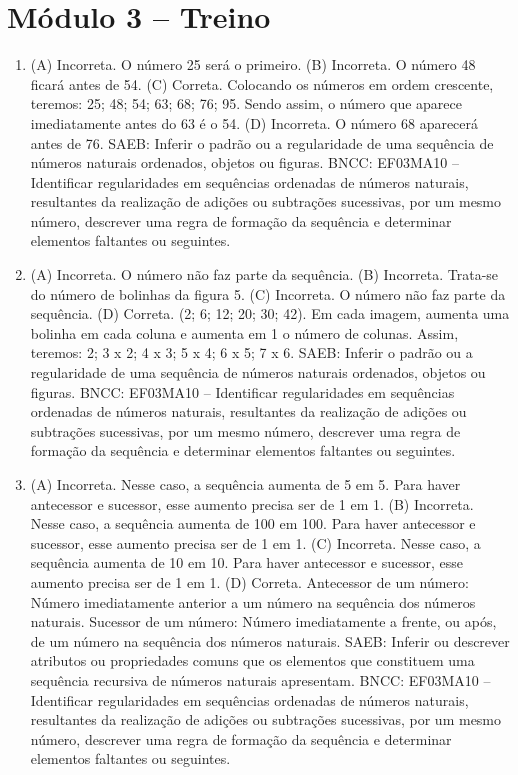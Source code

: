 \section*{Módulo 3 -- Treino}

\begin{enumerate}
\item
(A) Incorreta. O número 25 será o primeiro.
(B) Incorreta. O número 48 ficará antes de 54.
(C) Correta. Colocando os números em ordem crescente, teremos: 25; 48; 54; 63; 68; 76; 95. Sendo assim, o número que aparece imediatamente antes do 63 é o 54.
(D) Incorreta. O número 68 aparecerá antes de 76.
SAEB: Inferir o padrão ou a regularidade de uma sequência de números naturais ordenados, objetos ou figuras.
BNCC: EF03MA10 -- Identificar regularidades em sequências ordenadas de números naturais,
resultantes da realização de adições ou subtrações sucessivas, por um mesmo número,
descrever uma regra de formação da sequência e determinar elementos faltantes ou seguintes.

\item
(A) Incorreta. O número não faz parte da sequência.
(B) Incorreta. Trata-se do número de bolinhas da figura 5.
(C) Incorreta. O número não faz parte da sequência.
(D) Correta. (2; 6; 12; 20; 30; 42). Em cada imagem, aumenta uma bolinha em cada coluna e aumenta em 1 o número de colunas. Assim, teremos: 2; 3 x 2; 4 x 3; 5 x 4; 6 x 5; 7 x 6.
SAEB: Inferir o padrão ou a regularidade de uma sequência de números naturais ordenados, objetos ou figuras.
BNCC: EF03MA10 -- Identificar regularidades em sequências ordenadas de números naturais,
resultantes da realização de adições ou subtrações sucessivas, por um mesmo número,
descrever uma regra de formação da sequência e determinar elementos faltantes ou seguintes.

\item
(A) Incorreta. Nesse caso, a sequência aumenta de 5 em 5. Para haver antecessor e sucessor, esse aumento precisa ser de 1 em 1.
(B) Incorreta. Nesse caso, a sequência aumenta de 100 em 100. Para haver antecessor e sucessor, esse aumento precisa ser de 1 em 1.
(C) Incorreta. Nesse caso, a sequência aumenta de 10 em 10. Para haver antecessor e sucessor, esse aumento precisa ser de 1 em 1.
(D) Correta. Antecessor de um número: Número imediatamente anterior a um número na sequência dos números naturais. Sucessor de um número: Número imediatamente a frente, ou após, de um número na sequência dos números naturais.
SAEB: Inferir ou descrever atributos ou propriedades comuns que os elementos que constituem uma sequência recursiva de números naturais apresentam.
BNCC: EF03MA10 -- Identificar regularidades em sequências ordenadas de números naturais,
resultantes da realização de adições ou subtrações sucessivas, por um mesmo número,
descrever uma regra de formação da sequência e determinar elementos faltantes ou seguintes.
\end{enumerate}


